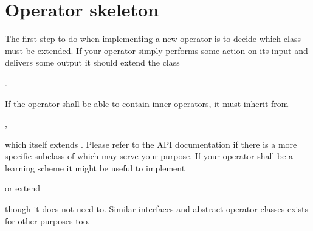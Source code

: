 \section{Operator skeleton}

The first step to do when implementing a new operator is to decide which class
must be extended. If your operator simply performs some action on its input and
delivers some output it should extend the class
\begin{center}
.
\end{center} 
If the operator shall be able to contain inner operators, it must
inherit from
\begin{center}
,
\end{center}
which itself extends . Please refer to the API
documentation if there is a more specific subclass of
 which may serve your purpose. If your operator shall be a
learning scheme it might be useful to implement
\begin{center}
\end{center}
or extend
\begin{center}
\end{center}
though it does not need to. Similar interfaces and abstract operator classes
exists for other purposes too.

